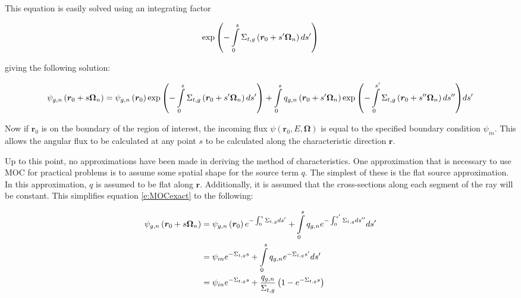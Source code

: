 This equation is easily solved using an integrating factor

\begin{equation}
\exp{\left(-\intop_0^s \Sigma_{t,g}\left(\bm r_0 + s'\bm\Omega_n\right)ds'\right)}
\end{equation}

giving the following solution:

\begin{dmath}\label{e:MOCexact}
{\psi_{g,n}\left(\bm r_0 + s\bm\Omega_n\right) = \psi_{g,n}\left(\bm r_0\right)\exp{\left(-\intop_0^s \Sigma_{t,g}\left(\bm r_0 + s'\bm\Omega_n\right)ds'\right)}} + {\intop_0^s q_{g,n}\left(\bm r_0 + s'\bm\Omega_n\right)\exp{\left(-\intop_0^{s'} \Sigma_{t,g}\left(\bm r_0 + s''\bm\Omega_n\right)ds''\right)}ds'}
\end{dmath}

Now if $\bm r_0$ is on the boundary of the region of interest, the incoming flux $\psi\left(\bm r_0,E,\bm \Omega\right)$ is equal to the specified boundary condition $\psi_{in}$.  This allows the angular flux to be calculated at any point $s$ to be calculated along the characteristic direction $\bm r$.

Up to this point, no approximations have been made in deriving the method of characteristics.  One approximation that is necessary to use MOC for practical problems is to assume some spatial shape for the source term $q$.  The simplest of these is the flat source approximation.  In this approximation, $q$ is assumed to be flat along $\bm r$.  Additionally, it is assumed that the cross-sections along each segment of the ray will be constant.  This simplifies equation \ref{e:MOCexact} to the following:

\begin{align}\label{e:MOCflatsource}
\psi_{g,n}\left(\bm r_0 + s\bm\Omega_n\right) &= \psi_{g,n}\left(\bm r_0\right)e^{-\intop_0^s \Sigma_{t,g} ds'} + \intop_0^s q_{g,n}e^{-\intop_0^{s'} \Sigma_{t,g}ds''}ds' \nonumber\\
 &= \psi_{in}e^{-\Sigma_{t,g} s} + \intop_0^s q_{g,n} e^{-\Sigma_{t,g} s'} ds' \nonumber \\
 &= \psi_{in}e^{-\Sigma_{t,g} s} + \frac{q_{g,n}}{\Sigma_{t,g}}\left(1 - e^{-\Sigma_{t,g}s}\right)
\end{align}

